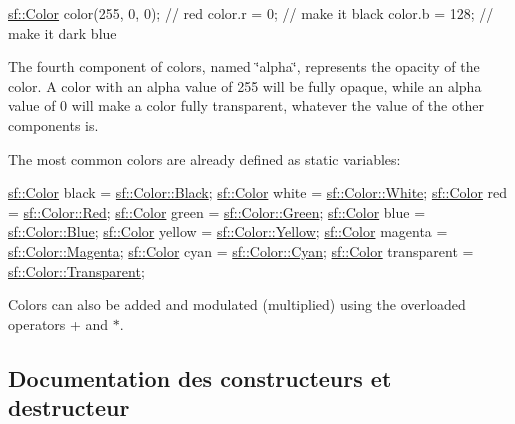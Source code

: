 \begin{DoxyCode}
\hyperlink{classsf_1_1Color}{sf::Color} color(255, 0, 0); \textcolor{comment}{// red}
color.r = 0;                \textcolor{comment}{// make it black}
color.b = 128;              \textcolor{comment}{// make it dark blue}
\end{DoxyCode}


The fourth component of colors, named \char`\"{}alpha\char`\"{}, represents the opacity of the color. A color with an alpha value of 255 will be fully opaque, while an alpha value of 0 will make a color fully transparent, whatever the value of the other components is.

The most common colors are already defined as static variables\+: 
\begin{DoxyCode}
\hyperlink{classsf_1_1Color}{sf::Color} black       = \hyperlink{classsf_1_1Color_a77c688197b981338f0b19dc58bd2facd}{sf::Color::Black};
\hyperlink{classsf_1_1Color}{sf::Color} white       = \hyperlink{classsf_1_1Color_a4fd874712178d9e206f53226002aa4ca}{sf::Color::White};
\hyperlink{classsf_1_1Color}{sf::Color} red         = \hyperlink{classsf_1_1Color_a127dbf55db9c07d0fa8f4bfcbb97594a}{sf::Color::Red};
\hyperlink{classsf_1_1Color}{sf::Color} green       = \hyperlink{classsf_1_1Color_a95629b30de8c6856aa7d3afed12eb865}{sf::Color::Green};
\hyperlink{classsf_1_1Color}{sf::Color} blue        = \hyperlink{classsf_1_1Color_ab03770d4817426b2614cfc33cf0e245c}{sf::Color::Blue};
\hyperlink{classsf_1_1Color}{sf::Color} yellow      = \hyperlink{classsf_1_1Color_af8896b5f56650935f5b9d72d528802c7}{sf::Color::Yellow};
\hyperlink{classsf_1_1Color}{sf::Color} magenta     = \hyperlink{classsf_1_1Color_a6fe70d90b65b2163dd066a84ac00426c}{sf::Color::Magenta};
\hyperlink{classsf_1_1Color}{sf::Color} cyan        = \hyperlink{classsf_1_1Color_a64ae9beb0b9a5865dd811cda4bb18340}{sf::Color::Cyan};
\hyperlink{classsf_1_1Color}{sf::Color} transparent = \hyperlink{classsf_1_1Color_a569b45471737f770656f50ae7bbac292}{sf::Color::Transparent};
\end{DoxyCode}


Colors can also be added and modulated (multiplied) using the overloaded operators + and $\ast$. 

\subsection{Documentation des constructeurs et destructeur}
\mbox{\label{classsf_1_1Color_ac2eb4393fb11ad3fa3ccf34e92fe08e4}} 
